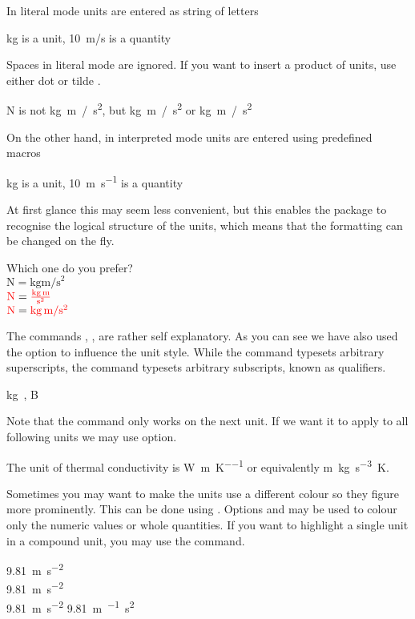 In literal mode units are entered as string of letters
\begin{example}
\unit{kg} is a unit,
\qty{10}{m/s} is a quantity
\end{example}
Spaces in literal mode are ignored. If you want to insert a product of units,
use either dot  or tilde \ai{\~{}}.
\begin{example}
\unit{N} is 
not \unit{kg m / s^2},
but \unit{kg.m / s^2}
or \unit{kg~m / s^2}
\end{example}

On the other hand, in interpreted mode units are entered using predefined
macros
\begin{example}
\unit{\kilo\gram} is a unit,
\qty{10}{\metre\per\second}
is a quantity
\end{example}
At first glance this may seem less convenient, but this enables the package to
recognise the logical structure of the units, which means that the formatting
can be changed on the fly.
\begin{example}[examplewidth=0.32\linewidth]
Which one do you prefer? \\
$\unit{\newton} = \unit{
  \kilo\gram\metre\per\square\second}$ \\
$\unit{\newton} = \unit[per-mode = fraction]{
  \kilo\gram\metre\per\second\squared}$ \\
$\unit{\N} = \unit[per-mode = symbol]{
  \kg\m\per\s\tothe{2}}$
\end{example}
The commands , ,  are rather self explanatory. As you
can see we have also used the  option to influence the unit
style. While the command  typesets arbitrary superscripts, the
command  typesets arbitrary subscripts, known as qualifiers.
\begin{example}[examplewidth=0.32\linewidth]
\unit{\kg{}}, \unit{\bel{}}
\end{example}

Note that the  command only works on the next unit. If we want it to
apply to all following units we may use  option.
\begin{example}[examplewidth=0.4\linewidth]
The unit of thermal conductivity is
\unit{\watt\per\metre\per\kelvin}
or equivalently
\unit[sticky-per]{\m\kg\per\s\cubed\K}. 
\end{example}

Sometimes you may want to make the units use a different colour so they figure more prominently. This can be done using . Options
 and  may be used to colour only the numeric
values or whole quantities. If you want to highlight a single unit in a
compound unit, you may use the  command.
\begin{example}[examplewidth=0.2\linewidth]
\qty[unit-color = red]{9.81}{\m\per\s\squared} \\
\qty[number-color = blue]{9.81}{\m\per\s\squared} \\
\qty[color = green]{9.81}{\m\per\s\squared}
\qty{9.81}{\m\per{}\s\squared}
\end{example}

